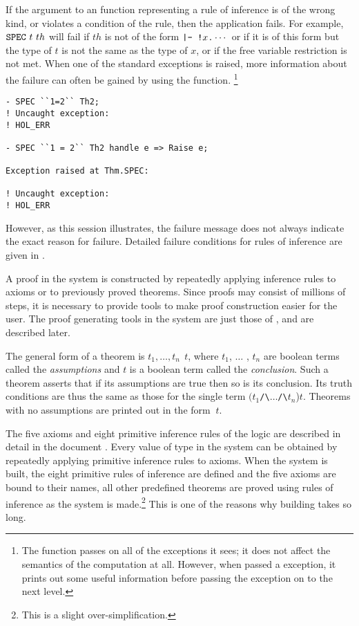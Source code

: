 If the argument to an \ML{} function representing a rule of inference is of the wrong kind, or violates a condition of the rule, then the application fails.
For example, $\ml{SPEC}\ t\ th$ will fail if $th$ is not of the form $\ml{|-\ !}x\ml{.}\cdots$ or if it is of this form but the type of $t$ is not the same as the type of $x$, or if the free variable restriction is not met.
When one of the standard  exceptions is raised, more information about the failure can often be gained by using the  function.%
\footnote{The  function passes on all of the exceptions it sees; it does not affect the semantics of the computation at all.
However, when passed a  exception, it prints out some useful information before passing the exception on to the next level.}

\begin{session}
\begin{verbatim}
- SPEC ``1=2`` Th2;
! Uncaught exception:
! HOL_ERR

- SPEC ``1 = 2`` Th2 handle e => Raise e;

Exception raised at Thm.SPEC:

! Uncaught exception:
! HOL_ERR\end{verbatim}
\end{session}
However, as this session illustrates, the failure message does not
always indicate the exact reason for failure. Detailed failure conditions
for rules of inference are given in \REFERENCE.

A proof in the \HOL{} system is constructed by repeatedly applying
inference rules to axioms or to previously proved theorems.  Since
proofs may consist of millions of steps, it is necessary to provide
tools to make proof construction easier for the user.  The proof
generating tools in the \HOL{} system are just those of \LCF, and are
described later.

The general form of a theorem is $t_1,\ldots,t_n\ $\ml{|-}$\ t$, where
$t_1$, $\ldots$ , $t_n$ are boolean terms called the {\it assumptions}
and $t$ is a boolean term called the {\it conclusion\/}.  Such a
theorem asserts that if its assumptions are true then so is its
conclusion.  Its truth conditions are thus the same as those for the
single term
$(t_1${\small\verb|/\|}$\ldots${\small\verb|/\|}$t_n$)\ml{==>}$t$.
Theorems with no assumptions are printed out in the form \ml{|-}$\ t$.

The five axioms and eight primitive inference rules of the \HOL{} logic
are described in detail in the document \DESCRIPTION.  Every value of
type  in the \HOL{} system can be obtained by repeatedly
applying primitive inference rules to axioms.  When the \HOL{} system
is built, the eight primitive rules of inference are defined and the
five axioms are bound to their \ML{} names, all other predefined
theorems are proved using rules of inference as the system is
made.\footnote{This is a slight over-simplification.} This is one of
the reasons why building  takes so long.

